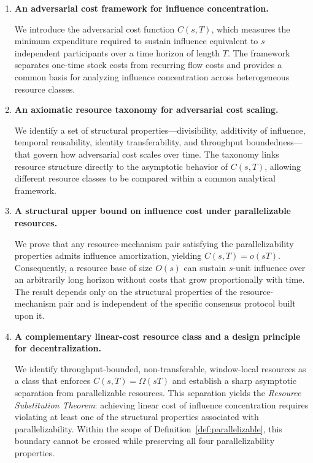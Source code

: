 \documentclass[manuscript,review]{acmart}
\theoremstyle{remark}
\begin{document}
	\begin{enumerate}
		
		\item \textbf{An adversarial cost framework for influence concentration.}
		
		We introduce the adversarial cost function $C(s,T)$,
		which measures the minimum expenditure required to
		sustain influence equivalent to $s$ independent
		participants over a time horizon of length $T$.
		The framework separates one-time stock costs from
		recurring flow costs and provides a common basis for
		analyzing influence concentration across heterogeneous
		resource classes.
		
		\item \textbf{An axiomatic resource taxonomy for adversarial cost scaling.}
		
		We identify a set of structural properties---divisibility,
		additivity of influence, temporal reusability, identity
		transferability, and throughput boundedness---that govern
		how adversarial cost scales over time. The taxonomy links
		resource structure directly to the asymptotic behavior of
		$C(s,T)$, allowing different resource classes to be
		compared within a common analytical framework.
		
		\item \textbf{A structural upper bound on influence cost under parallelizable resources.}
		
		We prove that any resource-mechanism pair satisfying the
		parallelizability properties admits influence amortization,
		yielding $C(s,T)=o(sT)$. Consequently, a resource base of
		size $O(s)$ can sustain $s$-unit influence over an
		arbitrarily long horizon without costs that grow
		proportionally with time. The result depends only on the
		structural properties of the resource-mechanism pair and
		is independent of the specific consensus protocol built
		upon it.
		
		\item \textbf{A complementary linear-cost resource class and a design principle for decentralization.}
		
		We identify throughput-bounded, non-transferable,
		window-local resources as a class that enforces
		$C(s,T)=\Omega(sT)$ and establish a sharp asymptotic
		separation from parallelizable resources. This separation
		yields the \emph{Resource Substitution Theorem}:
		achieving linear cost of influence concentration requires
		violating at least one of the structural properties
		associated with parallelizability. Within the scope of
		Definition~\ref{def:parallelizable}, this boundary cannot
		be crossed while preserving all four parallelizability
		properties.
		
	\end{enumerate}
	
\end{document}

